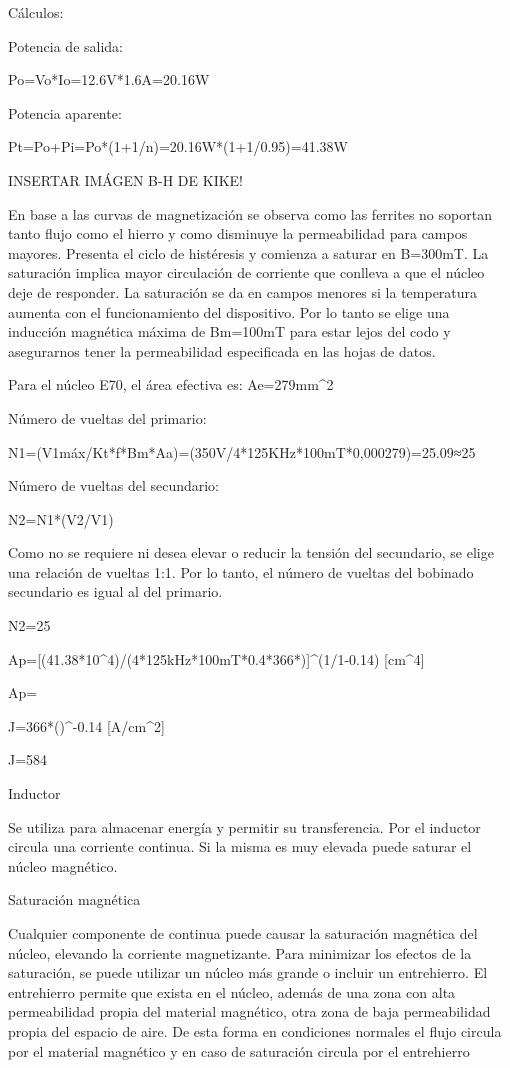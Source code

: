 Cálculos:

Potencia de salida:

Po=Vo*Io=12.6V*1.6A=20.16W

Potencia aparente: 

Pt=Po+Pi=Po*(1+1/n)=20.16W*(1+1/0.95)=41.38W

INSERTAR IMÁGEN B-H DE KIKE!

En base a las curvas de magnetización se observa como las ferrites no soportan tanto flujo como el hierro y como disminuye la permeabilidad para campos mayores.  
Presenta el ciclo de histéresis y comienza a saturar en B=300mT. 
La saturación implica mayor circulación de corriente que conlleva a que el núcleo deje de responder. 
La saturación se da en campos menores si la temperatura aumenta con el funcionamiento del dispositivo. 
Por lo tanto se elige una inducción magnética máxima de Bm=100mT para estar lejos del codo y asegurarnos tener la permeabilidad especificada en las hojas de datos. 

Para el núcleo E70, el área efectiva es: Ae=279mm^2

Número de vueltas del primario:

N1=(V1máx/Kt*f*Bm*Aa)=(350V/4*125KHz*100mT*0,000279)=25.09≈25
 
Número de vueltas del secundario: 

N2=N1*(V2/V1)

Como no se requiere ni desea elevar o reducir la tensión del secundario, se elige una relación de vueltas 1:1. 
Por lo tanto, el número de vueltas del bobinado secundario es igual al del primario. 

N2=25

Ap=[(41.38*10^4)/(4*125kHz*100mT*0.4*366*)]^(1/1-0.14) [cm^4]

Ap= 


J=366*()^-0.14 [A/cm^2]

J=584


Inductor

Se utiliza para almacenar energía y permitir su transferencia. 
Por el inductor circula una corriente continua. Si la misma es muy elevada puede saturar el núcleo magnético. 


Saturación magnética

Cualquier componente de continua puede causar la saturación magnética del núcleo, 
elevando la corriente magnetizante. 
Para minimizar los efectos de la saturación, se puede utilizar un núcleo más grande o incluir un entrehierro.
El entrehierro permite que exista en el núcleo, además de una zona con alta permeabilidad propia del material magnético, 
 otra zona de baja permeabilidad propia del espacio de aire. 
 De esta forma en condiciones normales el flujo circula por el material magnético y en caso de saturación circula por el entrehierro 